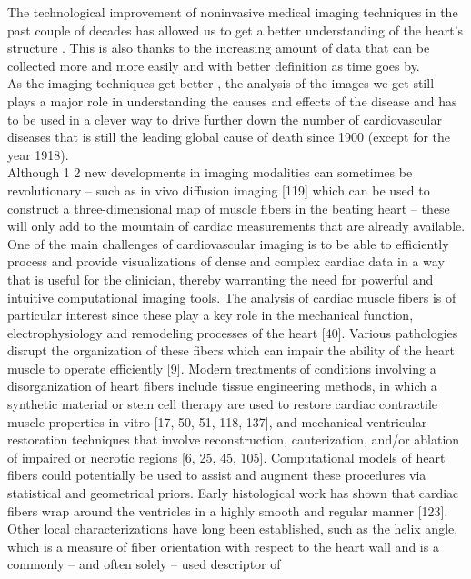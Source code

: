 The technological improvement of noninvasive medical imaging techniques in the past couple of decades has allowed us to get a better understanding of the heart's structure \cite{sinusas2008multimodality}. This is also thanks to the increasing amount of data that can be collected more and more easily and with better definition as time goes by. \\
As the imaging techniques get better \cite{shaw2010cardiovascular}, the analysis of the images we get still plays a major role in understanding the causes and effects of the disease and has to be used in a clever way to drive further down the number of cardiovascular diseases that is still the leading global cause of death \cite{mozaffarian2015heart} since 1900 (except for the year 1918). \\
Although
1
2
new developments in imaging modalities can sometimes be revolutionary – such as in
vivo diffusion imaging [119] which can be used to construct a three-dimensional map
of muscle fibers in the beating heart – these will only add to the mountain of cardiac
measurements that are already available. One of the main challenges of cardiovascular
imaging is to be able to efficiently process and provide visualizations of dense
and complex cardiac data in a way that is useful for the clinician, thereby warranting
the need for powerful and intuitive computational imaging tools. The analysis
of cardiac muscle fibers is of particular interest since these play a key role in the
mechanical function, electrophysiology and remodeling processes of the heart [40].
Various pathologies disrupt the organization of these fibers which can impair the
ability of the heart muscle to operate efficiently [9]. Modern treatments of conditions
involving a disorganization of heart fibers include tissue engineering methods,
in which a synthetic material or stem cell therapy are used to restore cardiac contractile
muscle properties in vitro [17, 50, 51, 118, 137], and mechanical ventricular
restoration techniques that involve reconstruction, cauterization, and/or ablation of
impaired or necrotic regions [6, 25, 45, 105]. Computational models of heart fibers
could potentially be used to assist and augment these procedures via statistical and
geometrical priors.
Early histological work has shown that cardiac fibers wrap around the ventricles
in a highly smooth and regular manner [123]. Other local characterizations have long
been established, such as the helix angle, which is a measure of fiber orientation with
respect to the heart wall and is a commonly – and often solely – used descriptor of
